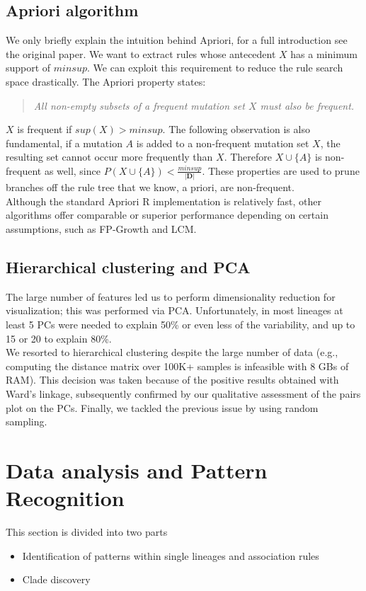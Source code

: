 \documentclass[twoside,twocolumn]{article}
\begin{document}
	\subsection{Apriori algorithm}
	We only briefly explain the intuition behind Apriori, for a full introduction see the original paper\cite{apriori}. We want to extract rules whose antecedent $X$ has a minimum support of $minsup$. We can exploit this requirement to reduce the rule search space drastically. The Apriori property states:
	\begin{quote}
		\textit{All non-empty subsets of a frequent mutation set $X$ must also be frequent.} 
	\end{quote}
	$X$ is frequent if $sup(X) > minsup$. The following observation is also fundamental, if a mutation $A$ is added to a non-frequent mutation set $X$, the resulting set cannot occur more frequently than $X$. Therefore $X\cup \{A\}$ is non-frequent as well, since $P(X\cup\{A\}) < \frac{minsup}{|\mathbf{D}|}$. These properties are used to prune branches off the rule tree that we know, a priori, are non-frequent. 
	\\
	Although the standard Apriori R implementation is relatively fast, other algorithms offer comparable or superior performance depending on certain assumptions, such as FP-Growth\cite{fpgrowth} and LCM\cite{lcm}. 
	\subsection{Hierarchical clustering and PCA}
	The large number of features led us to perform dimensionality reduction for visualization; this was performed via PCA. Unfortunately, in most lineages at least 5 PCs were needed to explain 50\% or even less of the variability, and up to 15 or 20 to explain 80\%. \\
	We resorted to hierarchical clustering despite the large number of data (e.g., computing the distance matrix over 100K+ samples is infeasible with 8 GBs of RAM). This decision was taken because of the positive results obtained with Ward's linkage, subsequently confirmed by our qualitative assessment of the pairs plot on the PCs. Finally, we tackled the previous issue by using random sampling.
	\section{Data analysis and Pattern Recognition}
	This section is divided into two parts
	\begin{itemize}
		\item Identification of patterns within single lineages and association rules
		\item Clade discovery
	\end{itemize}
\end{document}
